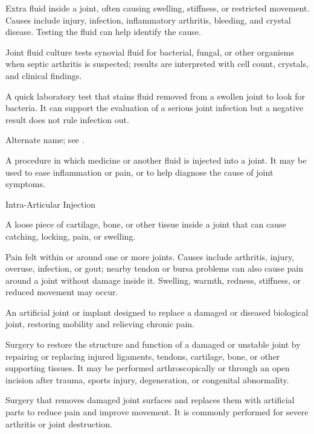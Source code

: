  Extra fluid inside a joint, often causing swelling, stiffness, or restricted movement. Causes include injury, infection, inflammatory arthritis, bleeding, and crystal disease. Testing the fluid can help identify the cause.

 Joint fluid culture tests synovial fluid for bacterial, fungal, or other organisms when septic arthritis is suspected; results are interpreted with cell count, crystals, and clinical findings.

 A quick laboratory test that stains fluid removed from a swollen joint to look for bacteria. It can support the evaluation of a serious joint infection but a negative result does not rule infection out.

 Alternate name; see .

 A procedure in which medicine or another fluid is injected into a joint. It may be used to ease inflammation or pain, or to help diagnose the cause of joint symptoms.

\synonyms
Intra-Articular Injection

 A loose piece of cartilage, bone, or other tissue inside a joint that can cause catching, locking, pain, or swelling.

 Pain felt within or around one or more joints. Causes include arthritis, injury, overuse, infection, or gout; nearby tendon or bursa problems can also cause pain around a joint without damage inside it. Swelling, warmth, redness, stiffness, or reduced movement may occur.

 An artificial joint or implant designed to replace a damaged or diseased biological
joint, restoring mobility and relieving chronic pain.

 Surgery to restore the structure and function of a damaged or unstable joint by repairing or replacing injured ligaments, tendons, cartilage, bone, or other supporting tissues. It may be performed arthroscopically or through an open incision after trauma, sports injury, degeneration, or congenital abnormality.

 Surgery that removes damaged joint surfaces and replaces them with artificial parts to reduce pain and improve movement. It is commonly performed for severe arthritis or joint destruction.

